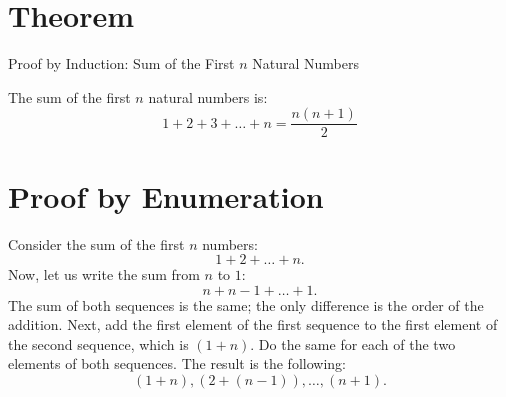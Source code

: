 \documentclass{article}
\begin{document}
\section{Theorem}
Proof by Induction: Sum of the First \( n \) Natural Numbers

The sum of the first \( n \) natural numbers is:
\[
    1 + 2 + 3 + \dots + n = \frac{n(n+1)}{2}
\]

\section{Proof by Enumeration}
Consider the sum of the first $n$ numbers:
\begin{equation}
    1+2+ \ldots + n.
\end{equation}
Now, let us write the sum from $n$ to $1$:
\begin{equation}
    n+n-1+ \ldots + 1.
\end{equation}
The sum of both sequences is the same; the only difference is the order of the addition. Next, add the first element of the first sequence to the first element of the second sequence, which is $(1+n)$. Do the same for each of the two elements of both sequences. The result is the following:
\begin{equation}
    (1+n), (2+(n-1)), \ldots, (n+1).
\end{equation}
\end{document}
